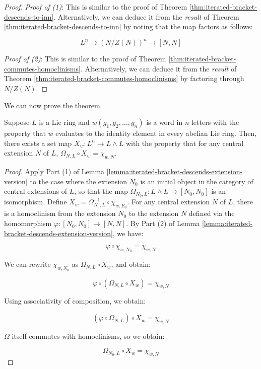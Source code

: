 
\begin{proof}
  {\em Proof of (1)}: This is similar to the proof of Theorem
  \ref{thm:iterated-bracket-descends-to-inn}. Alternatively, we can
  deduce it from the {\em result} of Theorem
  \ref{thm:iterated-bracket-descends-to-inn} by noting that the
  map factors as follows:

  $$L^n \to (N/Z(N))^n \to [N,N]$$

  {\em Proof of (2)}: This is similar to the proof of Theorem
  \ref{thm:iterated-bracket-commutes-homoclinisms}. Alternatively,
  we can deduce it from the {\em result} of Theorem
  \ref{thm:iterated-bracket-commutes-homoclinisms} by factoring
  through $N/Z(N)$.
\end{proof}

We can now prove the theorem.

\begin{theorem}\label{thm:iterated-bracket-map-to-exteriorsquare}
  Suppose $L$ is a Lie ring and $w(g_1,g_2,\dots,g_n)$ is a word in $n$
  letters with the property that $w$ evaluates to the identity element
  in every abelian Lie ring. Then, there exists a set map $X_w:L^n \to
  L \wedge L$ with the property that for any central extension $N$ of
  $L$, $\Omega_{N,L} \circ X_w = \chi_{w,N}$.
\end{theorem}

\begin{proof}
  Apply Part (1) of Lemma
  \ref{lemma:iterated-bracket-descends-extension-version} to the
  case where the extension $N_0$ is an initial object in the category
  of central extensions of $L$, so that the map $\Omega_{N_0,L}: L
  \wedge L \to [N_0,N_0]$ is an isomorphism. Define $X_w =
  \Omega_{N_0,L}^{-1} \circ \chi_{w,E_0}$. For any central extension
  $N$ of $L$, there is a homoclinism from the extension $N_0$ to the
  extension $N$ defined via the homomorphism $\varphi: [N_0,N_0] \to
  [N,N]$. By Part (2) of Lemma
  \ref{lemma:iterated-bracket-descends-extension-version}, we have:

  $$\varphi \circ \chi_{w,N_0} = \chi_{w,N}$$

  We can rewrite $\chi_{w,N_0}$ as $\Omega_{N,L} \circ X_w$, and obtain:

  $$\varphi \circ (\Omega_{N,L} \circ X_w) = \chi_{w,N}$$

  Using associativity of composition, we obtain:

  $$(\varphi \circ \Omega_{N,L}) \circ X_w = \chi_{w,N}$$

  $\Omega$ itself commutes with homoclinisms, so we obtain:

  $$\Omega_{N_0,L} \circ X_w = \chi_{w,N}$$
\end{proof}

